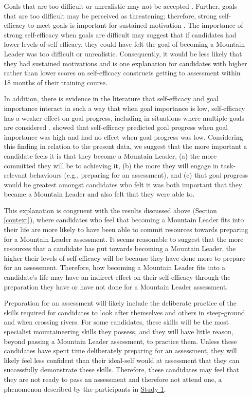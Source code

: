 \documentclass[
  12pt,
  a4paper,
]{book}
\begin{document}
Goals that are too difficult or unrealistic may not be accepted \citep{Kyllo1995}. Further, goals that are too difficult may be perceived as threatening; therefore, strong self-efficacy to meet goals is important for sustained motivation \citep{Bueno2008}. The importance of strong self-efficacy when goals are difficult may suggest that if candidates had lower levels of self-efficacy, they could have felt the goal of becoming a Mountain Leader was too difficult or unrealistic. Consequently, it would be less likely that they had sustained motivations and is one explanation for candidates with higher rather than lower scores on self-efficacy constructs getting to assessment within 18 months of their training course.

In addition, there is evidence in the literature that self-efficacy and goal importance interact in such a way that when goal importance is low, self-efficacy has a weaker effect on goal progress, including in situations where multiple goals are considered \citep[e.g.,][]{Beattie2015, Kernan1990, Orbell2001, Schmidt2007, Schmidt2009, Schmidt2009a}. \citet{Beattie2015} showed that self-efficacy predicted goal progress when goal importance was high and had no effect when goal progress was low. Considering this finding in relation to the present data, we suggest that the more important a candidate feels it is that they become a Mountain Leader, (a) the more committed they will be to achieving it, (b) the more they will engage in task-relevant behaviours (e.g., preparing for an assessment), and (c) that goal progress would be greatest amongst candidates who felt it was both important that they became a Mountain Leader and also felt that they were able to.

This explanation is congruent with the results discussed above (Section \ref{context}), where candidates who feel that becoming a Mountain Leader fits into their life are more likely to have been able to commit resources towards preparing for a Mountain Leader assessment. It seems reasonable to suggest that the more resources that a candidate has put towards becoming a Mountain Leader, the higher their levels of self-efficacy will be because they have done more to prepare for an assessment. Therefore, how becoming a Mountain Leader fits into a candidate's life may have an indirect effect on their self-efficacy through the preparation they have or have not done for a Mountain Leader assessment.

Preparation for an assessment will likely include the deliberate practice of the skills required for candidates to look after themselves and others in steep-ground and when crossing rivers. For some candidates, these skills will be the most specialist mountaineering skills they possess, and they will have little reason, beyond passing a Mountain Leader assessment, to practice them. Unless these candidates have spent time deliberately preparing for an assessment, they will likely feel less confident than their ideal-self would at assessment that they can successfully demonstrate these skills. Therefore, these candidates may feel that they are not ready to pass an assessment and therefore not attend one, a phenomenon described by the participants in \protect\hyperlink{ml-qualitative}{Study 1}.
\end{document}
